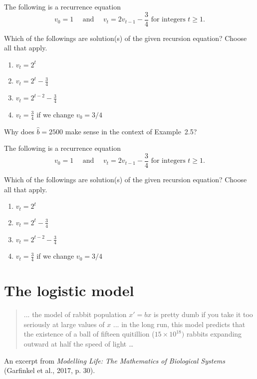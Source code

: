 \documentclass[14pt]{beamer}
\begin{document}
\begin{frame}[t]
  The following is a recurrence equation
  \[
    v_{0} = 1 \quad\text{ and }\quad v_{t} = 2 v_{t-1} - \frac{3}{4} \text{ for integers } t \ge 1.
  \]

  Which of the followings are solution(s) of the given recursion equation? Choose all that apply.

  \begin{enumerate}
    \item \(v_{t} = 2^{t}\)
    \item \(v_{t} = 2^{t} - \frac{3}{4}\)
    \item \(v_{t} = 2^{t-2} - \frac{3}{4}\)
    \item \(v_{t} = \frac{3}{4}\) if we change \(v_{0} = 3/4\)
  \end{enumerate}
\end{frame}

\begin{frame}
  Why does \(\hat{b} = 2500\) make sense in the context of Example~2.5?
\end{frame}

\begin{frame}[t]
  The following is a recurrence equation
  \[
    v_{0} = 1 \quad\text{ and }\quad v_{t} = 2 v_{t-1} - \frac{3}{4} \text{ for integers } t \ge 1.
  \]

  Which of the followings are solution(s) of the given recursion equation? Choose all that apply.

  \begin{enumerate}
    \item \(v_{t} = 2^{t}\)
    \item \(v_{t} = 2^{t} - \frac{3}{4}\)
    \item \(v_{t} = 2^{t-2} - \frac{3}{4}\)
    \item \(v_{t} = \frac{3}{4}\) if we change \(v_{0} = 3/4\)
  \end{enumerate}
\end{frame}

\section{The logistic model}

\begin{frame}
  \small

  \begin{quote}
    ... the model of rabbit population \(x' = bx\) is pretty dumb if you take it too seriously at large values of \(x\) ... in the long run, this model predicts that the existence of a ball of fifteen quitillion (\(15 \times 10^{18})\) rabbits expanding outward at half the speed of light \ldots{}
  \end{quote}

  An excerpt from \emph{Modelling Life: The Mathematics of Biological Systems} (Garfinkel et al., 2017, p. 30).
\end{frame}
\end{document}
